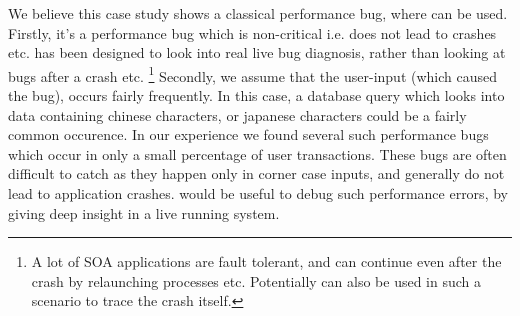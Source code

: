 We believe this case study shows a classical performance bug, where \parikshan can be used.
Firstly, it's a performance bug which is non-critical i.e. does not lead to crashes etc.
\parikshan has been designed to look into real live bug diagnosis, rather than looking at bugs after a crash etc.
\footnote{A lot of SOA applications are fault tolerant, and can continue even after the crash by relaunching processes etc. Potentially \parikshan can also be used in such a scenario to trace the crash itself.}
Secondly, we assume that the user-input (which caused the bug), occurs fairly frequently.
In this case, a database query which looks into data containing chinese characters, or japanese characters could be a fairly common occurence.
In our experience we found several such performance bugs which occur in only a small percentage of user transactions.
These bugs are often difficult to catch as they happen only in corner case inputs, and generally do not lead to application crashes.
\parikshan would be useful to debug such performance errors, by giving deep insight in a live running system.
\fi
